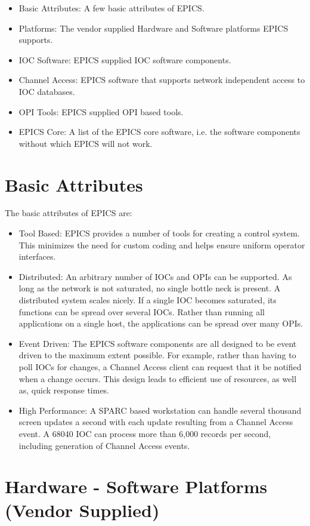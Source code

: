 \begin{itemize}\item Basic Attributes: A few basic attributes of EPICS.

\item Platforms: The vendor supplied Hardware and Software platforms EPICS supports.

\item IOC Software: EPICS supplied IOC software components.

\item Channel Access:  EPICS software that supports network independent access to IOC databases.

\item OPI Tools: EPICS supplied OPI based tools.

\item EPICS Core: A list of the EPICS core software, i.e. the software components without which EPICS will not work.

\end{itemize}\section{Basic Attributes}

The basic attributes of EPICS are:

\begin{itemize}\item Tool Based: EPICS provides a number of tools for creating a control system. This minimizes the need for custom 
coding and helps ensure uniform operator interfaces.

\item Distributed: An arbitrary number of IOCs and OPIs can be supported. As long as the network is not saturated, no 
single bottle neck is present. A distributed system scales nicely. If a single IOC becomes saturated, its functions can 
be spread over several IOCs. Rather than running all applications on a single host, the applications can be spread 
over many OPIs.

\item Event Driven: The EPICS software components are all designed to be event driven to the maximum extent 
possible. For example, rather than having to poll IOCs for changes, a Channel Access client can request that it be 
notified when a change occurs. This design leads to efficient use of resources, as well as, quick response times.

\item High Performance: A SPARC based workstation can handle several thousand screen updates a second with each 
update resulting from a Channel Access event. A 68040 IOC can process more than 6,000 records per second, 
including generation of Channel Access events. 

\end{itemize}\section{Hardware - Software Platforms (Vendor Supplied)}

